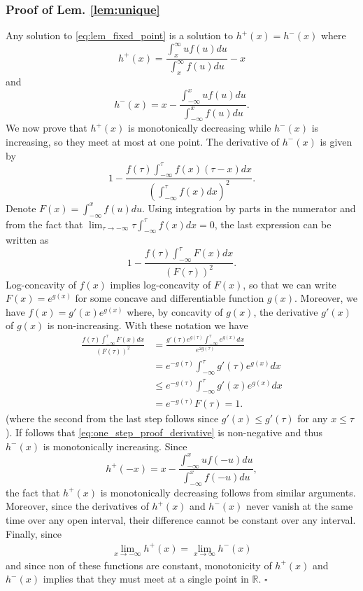 \documentclass[letterpaper, conference]{IEEEtran}      %
\newcommand*{\QEDA}{\hfill\ensuremath{\square}}
\begin{document}
\subsubsection*{Proof of Lem. \ref{lem:unique}} 
Any solution to \eqref{eq:lem_fixed_point} is a solution to $h^+(x) = h^-(x)$ where
\[
h^+(x) = \frac{\int_x^\infty uf(u)du}{\int_x^\infty f(u)du} - x 
\]
and
\[
h^-(x) = x - \frac{\int_{-\infty}^x uf(u)du}{\int_{-\infty}^x f(u)du}.
\]
We now prove that $h^+(x)$ is monotonically decreasing while $h^-(x)$ is increasing, so they meet at most at one point. The derivative of $h^-(x)$ is given by
\begin{equation} 
\label{eq:one_step_proof_derivative}
1 - \frac{ f(\tau) \int_{-\infty}^\tau f(x) (\tau-x)dx } {\left( \int_{-\infty}^\tau f(x) dx \right)^2}.
\end{equation}
Denote $F(x) = \int_{-\infty}^x f(u)du$. Using integration by parts in the numerator and from the fact that $\lim_{\tau \rightarrow -\infty}  \tau \int_{-\infty}^\tau f(x) dx = 0$, the last expression can be written as
\[
1- \frac{ f(\tau) \int_{-\infty}^\tau F(x) dx}
 {\left( F(\tau) \right)^2}.
\]
Log-concavity of $f(x)$ implies log-concavity of $F(x)$, so that we can write $F(x) = e^{g(x)}$ for some concave and differentiable function $g(x)$. Moreover, we have $f(x) = g'(x)e^{g(x)}$ where, by concavity of $g(x)$, the derivative $g'(x)$ of $g(x)$ is non-increasing. With these notation we have
\begin{align*}
\frac{ f(\tau) \int_{-\infty}^\tau F(x) dx}
 {\left( F(\tau) \right)^2} & = \frac{g'(\tau)e^{g(\tau)} \int_{-\infty}^\tau e^{g(x)}dx }{ e^{2g(\tau)} } \\
 & = e^{-g(\tau)} \int_{-\infty}^\tau g'(\tau) e^{g(x)} dx  \\
 & \leq e^{-g(\tau)} \int_{-\infty}^\tau g'(x) e^{g(x)} dx \\
 & = e^{-g(\tau)} F(\tau) = 1.
\end{align*}
(where the second from the last step follows since $g'(x) \leq g'(\tau)$ for any $x\leq \tau$). If follows that \eqref{eq:one_step_proof_derivative} is non-negative and thus $h^-(x)$ is monotonically increasing. Since
\[
h^+(-x) = x - \frac{ \int_{-\infty}^{x} uf(-u)du}{ \int_{-\infty}^x f(-u) du }, 
\]
the fact that $h^+(x)$ is monotonically decreasing follows from similar arguments. Moreover, since the derivatives of $h^+(x)$ and $h^-(x)$ never vanish at the same time over any open interval, their difference cannot be constant over any interval. Finally, since 
\begin{align*}
 \lim_{x\rightarrow -\infty} h^+(x) =  \lim_{x\rightarrow \infty} h^-(x)
\end{align*}
and since non of these functions are constant, monotonicity of $h^+(x)$ and $h^-(x)$ implies that they must meet at a single point in $\mathbb R$. \QEDA
\end{document}

